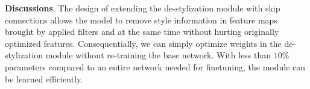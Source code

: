 \documentclass[letterpaper]{article} %
\newcommand{\instagram}{{\scshape ImageNet-Instagram}\xspace}
\newcommand{\imagenet}{{\scshape ImageNet}\xspace}
\begin{document}
\textbf{Discussions}. The design of extending the de-stylization module with skip connections allows the model to remove style information in feature maps brought by applied filters and at the same time without hurting originally optimized features. Consequentially, we can simply optimize weights in the de-stylization module without re-training the base network. With less than $ 10\%$ parameters compared to an entire network needed for finetuning, the module can be learned efficiently.



\end{document}
